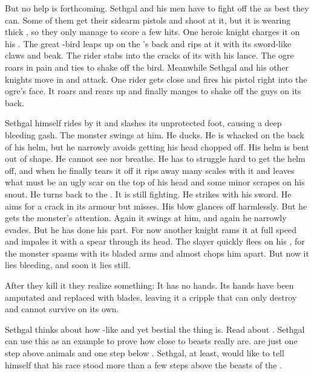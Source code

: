 
But no help is forthcoming.
Sethgal and his men have to fight off the \nephil as best they can. 
Some of them get their sidearm pistols and shoot at it, but it is wearing thick \armour, so they only manage to score a few hits. 
One heroic knight charges it on his \grulcan. 
The great \grulcan-bird leaps up on the \nephil's back and rips at it with its sword-like claws and beak.
The rider stabs into the cracks of its \armour with his lance. 
The ogre roars in pain and ties to shake off the bird. 
Meanwhile Sethgal and his other knights move in and attack. 
One rider gets close and fires his pistol right into the ogre's face. 
It roars and rears up and finally manges to shake off the guys on its back. 

Sethgal himself rides by it and slashes its unprotected foot, causing a deep bleeding gash. 
The monster swings at him.
He ducks.
He is whacked on the back of his helm, but he narrowly avoids getting his head chopped off. 
His helm is bent out of shape.
He cannot see nor breathe.
He has to struggle hard to get the helm off, and when he finally tears it off it rips away many scales with it and leaves what must be an ugly scar on the top of his head and some minor scrapes on his snout. 
He turns back to the \nephil.
It is still fighting. 
He strikes with his sword. 
He aims for a crack in its armour but misses.
His blow glances off harmlessly. 
But he gets the monster's attention.
Again it swings at him, and again he narrowly evades. 
But he has done his part.
For now another knight rams it at full speed and impales it with a spear through its head. 
The slayer quickly flees on his \relc, for the monster spasms with its bladed arms and almost chops him apart. 
But now it lies bleeding, and soon it lies still. 

After they kill it they realize something: 
It has no hands.
Its hands have been amputated and replaced with blades, leaving it a cripple that can only destroy and cannot survive on its own. 

Sethgal thinks about how \human-like and yet bestial the thing is. 
Read about . 
Sethgal can use this as an example to prove how close to beasts \humans really are. 
\Nephilim are just one step above animals and one step below \humans.
Sethgal, at least, would like to tell himself that his race stood more than a few steps above the beasts of the \wylde. 


